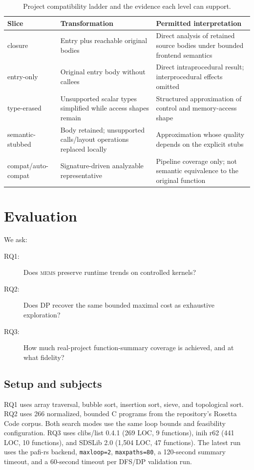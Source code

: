 \documentclass[10pt,conference]{IEEEtran}
\newcommand{\mems}{\textsc{mems}\xspace}
\newcommand{\code}[1]{\texttt{#1}}
\begin{document}
\begin{table}[t]
\centering
\caption{Project compatibility ladder and the evidence each level can support.}
\label{tab:ladder}
\begin{tabular}{p{}p{}p{}}
\toprule
Slice & Transformation & Permitted interpretation\\
\midrule
closure & Entry plus reachable original bodies & Direct analysis of retained source bodies under bounded frontend semantics\\
entry-only & Original entry body without callees & Direct intraprocedural result; interprocedural effects omitted\\
type-erased & Unsupported scalar types simplified while access shapes remain & Structured approximation of control and memory-access shape\\
semantic-stubbed & Body retained; unsupported calls/layout operations replaced locally & Approximation whose quality depends on the explicit stubs\\
compat/auto-compat & Signature-driven analyzable representative & Pipeline coverage only; not semantic equivalence to the original function\\
\bottomrule
\end{tabular}
\end{table}

\section{Evaluation}
We ask:
\begin{description}
\item[RQ1:] Does \mems preserve runtime trends on controlled kernels?
\item[RQ2:] Does DP recover the same bounded maximal cost as exhaustive exploration?
\item[RQ3:] How much real-project function-summary coverage is achieved, and at what fidelity?
\end{description}

\subsection{Setup and subjects}
RQ1 uses array traversal, bubble sort, insertion sort, sieve, and topological sort. RQ2 uses 266 normalized, bounded C programs from the repository's Rosetta Code corpus. Both search modes use the same loop bounds and feasibility configuration. RQ3 uses clibs/list 0.4.1 (269 LOC, 9 functions), inih r62 (441 LOC, 10 functions), and SDSLib 2.0 (1,504 LOC, 47 functions). The latest run uses the pafi-rs backend, \code{maxloop=2}, \code{maxpaths=80}, a 120-second summary timeout, and a 60-second timeout per DFS/DP validation run.
\end{document}
